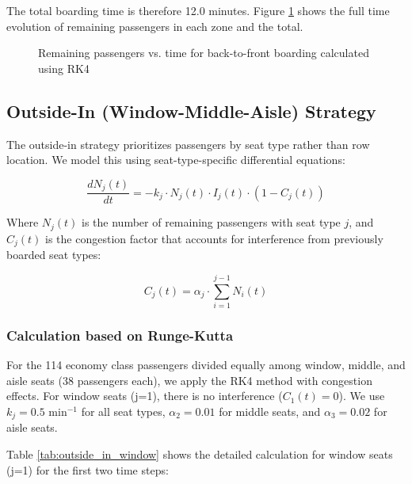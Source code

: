 The total boarding time is therefore 12.0 minutes. Figure \ref{fig:back_to_front_rk4} shows the full time evolution of remaining passengers in each zone and the total.

\begin{figure}[h]
\centering
\caption{Remaining passengers vs. time for back-to-front boarding calculated using RK4}
\label{fig:back_to_front_rk4}
\end{figure}

\subsection{Outside-In (Window-Middle-Aisle) Strategy}

The outside-in strategy prioritizes passengers by seat type rather than row location. We model this using seat-type-specific differential equations:

\begin{equation}
\frac{dN_j(t)}{dt} = -k_j \cdot N_j(t) \cdot I_j(t) \cdot (1-C_j(t))
\end{equation}

Where $N_j(t)$ is the number of remaining passengers with seat type $j$, and $C_j(t)$ is the congestion factor that accounts for interference from previously boarded seat types:

\begin{equation}
C_j(t) = \alpha_j \cdot \sum_{i=1}^{j-1} N_i(t)
\end{equation}

\subsubsection{Calculation based on Runge-Kutta}

For the 114 economy class passengers divided equally among window, middle, and aisle seats (38 passengers each), we apply the RK4 method with congestion effects. For window seats (j=1), there is no interference ($C_1(t) = 0$). We use $k_j = 0.5$ min$^{-1}$ for all seat types, $\alpha_2 = 0.01$ for middle seats, and $\alpha_3 = 0.02$ for aisle seats.

Table \ref{tab:outside_in_window} shows the detailed calculation for window seats (j=1) for the first two time steps:

